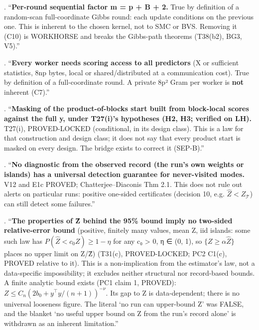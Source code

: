 \begin{description}[style=nextline,leftmargin=1.2cm]
\item[\defid{LIM01}] . ``\textbf{Per-round sequential factor m = p + B + 2.} True by definition of a random-scan full-coordinate Gibbs round: each update conditions on the previous one. This is inherent to the chosen kernel, not to SMC or BVS. Removing it (C10) is WORKHORSE and breaks the Gibbs-path theorems (T38(b2), BG3, V5).'' 
\item[\defid{LIM02}] . ``\textbf{Every worker needs scoring access to all predictors} (X or sufficient statistics, 8np bytes, local or shared/distributed at a communication cost). True by definition of a full-coordinate round. A private 8p² Gram per worker is \textbf{not} inherent (C7).'' 
\item[\defid{LIM03}] . ``\textbf{Masking of the product-of-blocks start built from block-local scores against the full y, under T27(i)'s hypotheses (H2, H3; verified on LH).} T27(i), PROVED-LOCKED (conditional, in its design class). This is a law for that construction and design class; it does not say that every product start is masked on every design. The bridge exists to correct it (SEP-B).'' 
\item[\defid{LIM04}] . ``\textbf{No diagnostic from the observed record (the run's own weights or islands) has a universal detection guarantee for never-visited modes.} V12 and E1c PROVED; Chatterjee–Diaconis Thm 2.1. This does not rule out alerts on particular runs: positive one-sided certificates (decision 10, e.g. $\hat{Z} < Z_{𝒯}$) can still detect some failures.'' 
\item[\defid{LIM05}] . ``\textbf{The properties of Ẑ behind the 95\% bound imply no two-sided relative-error bound} (positive, finitely many values, mean Z, iid islands: some such law has $P(\hat{Z} < c_0Z) ≥ 1 − η$ for any c₀ > 0, η ∈ (0, 1), so $\{Z ≥ α\hat{Z}\}$ places no upper limit on Z/Ẑ) (T31(c), PROVED-LOCKED; PC2 C1(c), PROVED relative to it). This is a non-implication from the estimator's law, not a data-specific impossibility; it excludes neither structural nor record-based bounds. A finite analytic bound exists (PC1 claim 1, PROVED): $Z ≤ C_n(2b_0 + y^{\top}y/(n+1))^{−ν}$. Its gap to Z is data-dependent; there is no universal looseness figure. The literal `no run can upper-bound Z' was FALSE, and the blanket `no useful upper bound on Z from the run's record alone' is withdrawn as an inherent limitation.'' 

\end{description}
